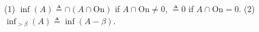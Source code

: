 (1) $\inf(A) \triangleq \cap(A \cap \text{On})$ if $A \cap \text{On} \neq 0$,
$\triangleq 0$ if $A \cap \text{On} = 0$.
(2) $\inf_{>\beta}(A) \triangleq \inf(A - \beta)$.

